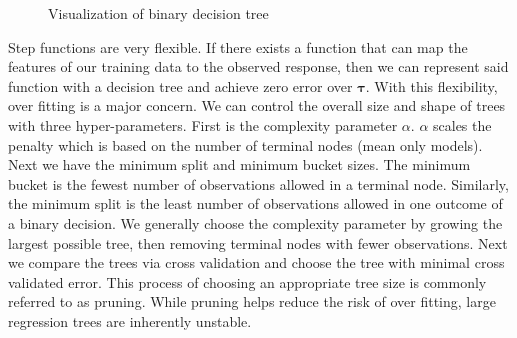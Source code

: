\documentclass[
  12pt,
  letterpaper,
  DIV=11,
  numbers=noendperiod]{scrartcl}
\newcommand{\bm}{\mathbf}
\begin{document}
\begin{figure}[H]


\caption{\label{fig-tree-examp}Visualization of binary decision tree}

\end{figure}%

Step functions are very flexible. If there exists a function that can
map the features of our training data to the observed response, then we
can represent said function with a decision tree and achieve zero error
over \(\bm \tau\). With this flexibility, over fitting is a major
concern. We can control the overall size and shape of trees with three
hyper-parameters. First is the complexity parameter \(\alpha\).
\(\alpha\) scales the penalty which is based on the number of terminal
nodes (mean only models). Next we have the minimum split and minimum
bucket sizes. The minimum bucket is the fewest number of observations
allowed in a terminal node. Similarly, the minimum split is the least
number of observations allowed in one outcome of a binary decision. We
generally choose the complexity parameter by growing the largest
possible tree, then removing terminal nodes with fewer observations.
Next we compare the trees via cross validation and choose the tree with
minimal cross validated error. This process of choosing an appropriate
tree size is commonly referred to as pruning. While pruning helps reduce
the risk of over fitting, large regression trees are inherently
unstable.
\end{document}
